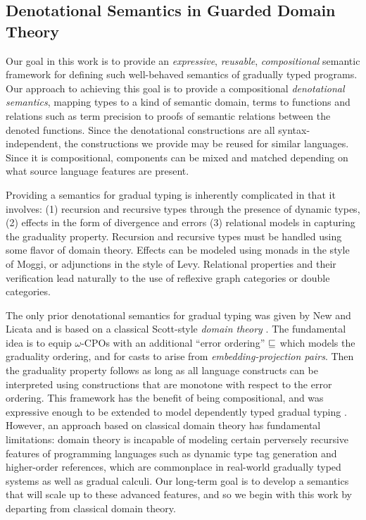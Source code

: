\subsection{Denotational Semantics in Guarded Domain Theory}

Our goal in this work is to provide an \emph{expressive},
\emph{reusable}, \emph{compositional} semantic framework for defining
such well-behaved semantics of gradually typed programs.
%
Our approach to achieving this goal is to provide a compositional
\emph{denotational semantics}, mapping types to a kind of semantic
domain, terms to functions and relations such as term precision to
proofs of semantic relations between the denoted functions.
%
Since the denotational constructions are all syntax-independent, the
constructions we provide may be reused for similar languages. Since it
is compositional, components can be mixed and matched depending on
what source language features are present.

Providing a semantics for gradual typing is inherently complicated in
that it involves: (1) recursion and recursive types through the
presence of dynamic types, (2) effects in the form of divergence and
errors (3) relational models in capturing the graduality
property. Recursion and recursive types must be handled using some
flavor of domain theory. Effects can be modeled using monads in the
style of Moggi, or adjunctions in the style of
Levy\cite{moggi,levy}. Relational properties and their verification
lead naturally to the use of reflexive graph categories or double
categories\cite{reflgraphcats,doublecats}.

The only prior denotational semantics for gradual typing was given by
New and Licata and is based on a classical Scott-style \emph{domain
theory} \cite{new-licata18}. The fundamental idea is to equip
$\omega$-CPOs with an additional ``error ordering'' $\sqsubseteq$ which
models the graduality ordering, and for casts to arise from
\emph{embedding-projection pairs}. Then the graduality property
follows as long as all language constructs can be interpreted using
constructions that are monotone with respect to the error ordering.
%
This framework has the benefit of being compositional, and was
expressive enough to be extended to model dependently typed gradual
typing \cite{gradualizing-cic}.
%
However, an approach based on classical domain theory has fundamental
limitations: domain theory is incapable of modeling certain perversely
recursive features of programming languages such as dynamic type tag
generation and higher-order references, which are commonplace in
real-world gradually typed systems as well as gradual calculi.
%
Our long-term goal is to develop a semantics that will scale up to these
advanced features, and so we begin with this work by departing from
classical domain theory.


